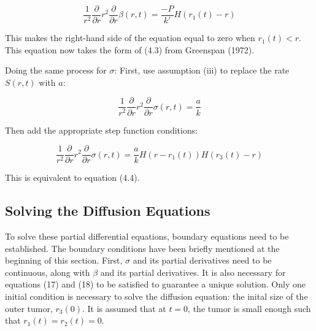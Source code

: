 \documentclass{article}
\begin{document}
\begin{equation}
    \frac{1}{r^2} \frac{\partial}{\partial r} r^2 \frac{\partial}{\partial r} \beta(r, t) = \frac{-P}{k'} H(r_1(t) - r)
\end{equation}

This makes the right-hand side of the equation equal to zero when $r_1(t) < r$. This equation now takes the form of (4.3) from Greenspan (1972).

\vspace*{0.25cm}

Doing the same process for $\sigma$: First, use assumption (iii) to replace the rate $S(r, t)$ with $a$:

\begin{equation}
    \frac{1}{r^2} \frac{\partial}{\partial r} r^2 \frac{\partial}{\partial r} \sigma(r, t) = \frac{a}{k}
\end{equation}

Then add the appropriate step function conditions:

\begin{equation}
    \frac{1}{r^2} \frac{\partial}{\partial r} r^2 \frac{\partial}{\partial r} \sigma(r, t) = \frac{a}{k} H(r - r_1(t)) H(r_3(t) - r)
\end{equation}

This is equivalent to equation (4.4).

\subsection{Solving the Diffusion Equations}

To solve these partial differential equations, boundary equations need to be established. The boundary conditions have been briefly mentioned at the beginning of this
section. First, $\sigma$ and its partial derivatives need to be continuous, along with $\beta$ and its partial derivatives. It is also necessary for equations
(17) and (18) to be satisfied to guarantee a unique solution. Only one initial condition is necessary to solve the diffusion equation: the inital size of the outer
tumor, $r_3(0)$. It is assumed that at $t = 0$, the tumor is small enough such that $r_1(t) = r_2(t) = 0$.
\end{document}

